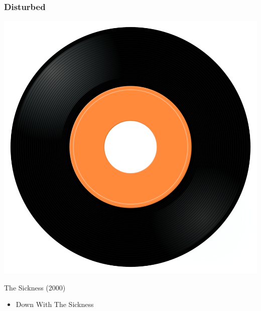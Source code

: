 \subsubsection{Disturbed}

\begin{minipage}[t]{0.25\textwidth}
\captionsetup{type=figure}
\includegraphics[width=\textwidth]{Images/cover.png}
\caption*{The Sickness (2000)}
\end{minipage}
\begin{minipage}[t]{0.25\textwidth}\vspace{0pt}
\begin{itemize}[nosep,leftmargin=1em,labelwidth=*,align=left]
	\setlength{\itemsep}{0pt}
	\item Down With The Sickness
\end{itemize}
\end{minipage}
